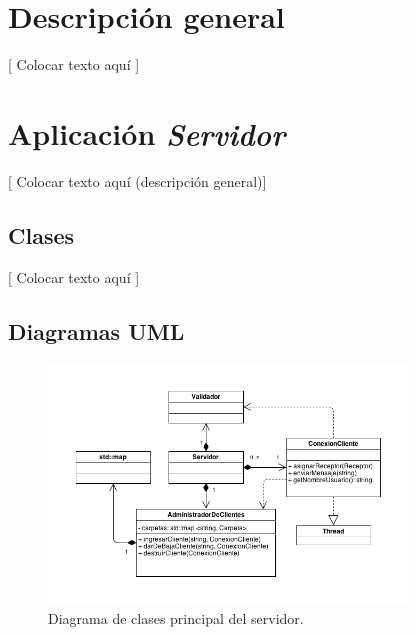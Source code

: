 \documentclass{article}
\begin{document}
\section{Descripción general}

	[ Colocar texto aquí ]
\bigskip




\section{Aplicación \textit{Servidor}}

	[ Colocar texto aquí (descripción general)]
\bigskip



\subsection{Clases}

	[ Colocar texto aquí ]
\bigskip



\subsection{Diagramas UML}


\begin{figure}[h]
	\centering
	\includegraphics[width=0.85\textwidth]{images/Diagrama-modelo-servidor-parte1.png}
	\caption{Diagrama de clases principal del servidor.}
\end{figure}
\bigskip

\newpage
\end{document}
